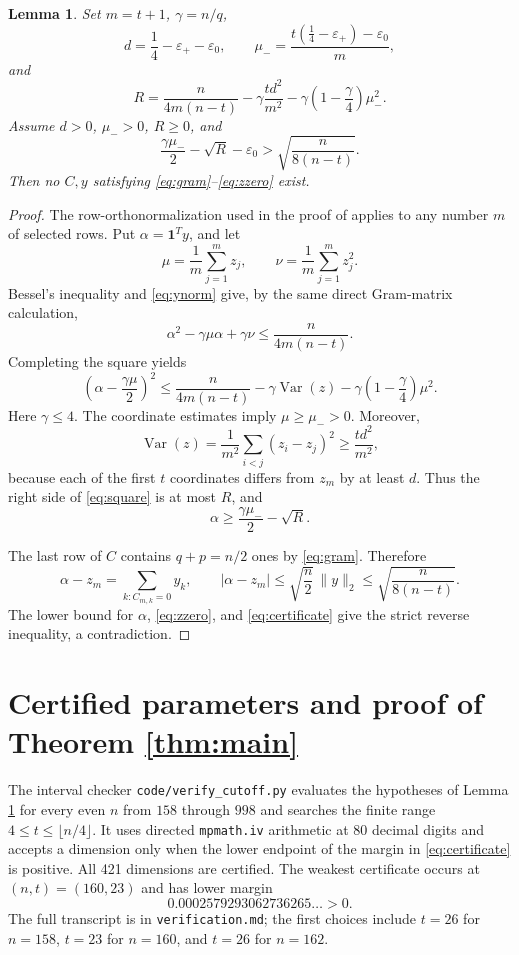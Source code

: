 \documentclass[10pt]{article}
\newtheorem{lemma}{Lemma}
\newcommand{\one}{\mathbf 1}
\begin{document}
\begin{lemma}\label{lem:projection}
Set $m=t+1$, $\gamma=n/q$,
\[
 d=\frac14-\varepsilon_+-\varepsilon_0,
 \qquad
 \mu_- =\frac{t(\frac14-\varepsilon_+)-\varepsilon_0}{m},
\]
and
\[
 R=\frac{n}{4m(n-t)}
 -\gamma\frac{t d^2}{m^2}
 -\gamma\left(1-\frac\gamma4\right)\mu_-^2.
\]
Assume $d>0$, $\mu_->0$, $R\ge0$, and
\begin{equation}\label{eq:certificate}
 \frac{\gamma\mu_-}{2}-\sqrt R-\varepsilon_0
 >\sqrt{\frac{n}{8(n-t)}}.
\end{equation}
Then no $C,y$ satisfying \eqref{eq:gram}--\eqref{eq:zzero} exist.
\end{lemma}

\begin{proof}
The row-orthonormalization used in the proof of
\cite[Lemma 3.3]{FrankelUrschel} applies to any number $m$ of selected rows.
Put $\alpha=\one^Ty$, and let
\[
 \mu=\frac1m\sum_{j=1}^m z_j,
 \qquad
 \nu=\frac1m\sum_{j=1}^m z_j^2.
\]
Bessel's inequality and \eqref{eq:ynorm} give, by the same direct Gram-matrix
calculation,
\[
 \alpha^2-\gamma\mu\alpha+\gamma\nu
 \le \frac{n}{4m(n-t)}.
\]
Completing the square yields
\begin{equation}\label{eq:square}
 \left(\alpha-\frac{\gamma\mu}{2}\right)^2
 \le \frac{n}{4m(n-t)}
 -\gamma\operatorname{Var}(z)
 -\gamma\left(1-\frac\gamma4\right)\mu^2.
\end{equation}
Here $\gamma\le4$.  The coordinate estimates imply $\mu\ge\mu_->0$.
Moreover,
\[
 \operatorname{Var}(z)
 =\frac1{m^2}\sum_{i<j}(z_i-z_j)^2
 \ge \frac{t d^2}{m^2},
\]
because each of the first $t$ coordinates differs from $z_m$ by at least $d$.
Thus the right side of \eqref{eq:square} is at most $R$, and
\[
 \alpha\ge\frac{\gamma\mu_-}{2}-\sqrt R.
\]

The last row of $C$ contains $q+p=n/2$ ones by \eqref{eq:gram}.  Therefore
\[
 \alpha-z_m=\sum_{k:C_{m,k}=0}y_k,
 \qquad
 |\alpha-z_m|\le\sqrt{\frac n2}\,\|y\|_2
 \le\sqrt{\frac{n}{8(n-t)}}.
\]
The lower bound for $\alpha$, \eqref{eq:zzero}, and
\eqref{eq:certificate} give the strict reverse inequality, a contradiction.
\end{proof}

\section*{Certified parameters and proof of Theorem \ref{thm:main}}

The interval checker \texttt{code/verify\_cutoff.py} evaluates the hypotheses
of Lemma \ref{lem:projection} for every even $n$ from $158$ through $998$ and
searches the finite range $4\le t\le\lfloor n/4\rfloor$.  It uses directed
\texttt{mpmath.iv} arithmetic at 80 decimal digits and accepts a dimension only
when the lower endpoint of the margin in \eqref{eq:certificate} is positive.
All 421 dimensions are certified.  The weakest certificate occurs at
$(n,t)=(160,23)$ and has lower margin
\[
 0.0002579293062736265\ldots>0.
\]
The full transcript is in \texttt{verification.md}; the first choices include
$t=26$ for $n=158$, $t=23$ for $n=160$, and $t=26$ for $n=162$.
\end{document}

